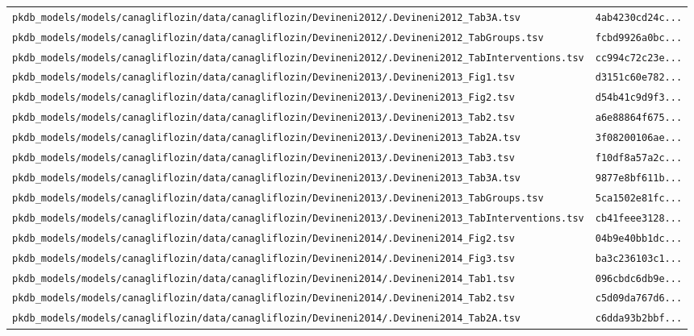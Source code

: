 \documentclass{article}
\begin{document}
\begin{longtable}{ll}
\texttt{pkdb\_models/models/canagliflozin/data/canagliflozin/Devineni2012/.Devineni2012\_Tab3A.tsv} & \texttt{4ab4230cd24c...} \\
\texttt{pkdb\_models/models/canagliflozin/data/canagliflozin/Devineni2012/.Devineni2012\_TabGroups.tsv} & \texttt{fcbd9926a0bc...} \\
\texttt{pkdb\_models/models/canagliflozin/data/canagliflozin/Devineni2012/.Devineni2012\_TabInterventions.tsv} & \texttt{cc994c72c23e...} \\
\texttt{pkdb\_models/models/canagliflozin/data/canagliflozin/Devineni2013/.Devineni2013\_Fig1.tsv} & \texttt{d3151c60e782...} \\
\texttt{pkdb\_models/models/canagliflozin/data/canagliflozin/Devineni2013/.Devineni2013\_Fig2.tsv} & \texttt{d54b41c9d9f3...} \\
\texttt{pkdb\_models/models/canagliflozin/data/canagliflozin/Devineni2013/.Devineni2013\_Tab2.tsv} & \texttt{a6e88864f675...} \\
\texttt{pkdb\_models/models/canagliflozin/data/canagliflozin/Devineni2013/.Devineni2013\_Tab2A.tsv} & \texttt{3f08200106ae...} \\
\texttt{pkdb\_models/models/canagliflozin/data/canagliflozin/Devineni2013/.Devineni2013\_Tab3.tsv} & \texttt{f10df8a57a2c...} \\
\texttt{pkdb\_models/models/canagliflozin/data/canagliflozin/Devineni2013/.Devineni2013\_Tab3A.tsv} & \texttt{9877e8bf611b...} \\
\texttt{pkdb\_models/models/canagliflozin/data/canagliflozin/Devineni2013/.Devineni2013\_TabGroups.tsv} & \texttt{5ca1502e81fc...} \\
\texttt{pkdb\_models/models/canagliflozin/data/canagliflozin/Devineni2013/.Devineni2013\_TabInterventions.tsv} & \texttt{cb41feee3128...} \\
\texttt{pkdb\_models/models/canagliflozin/data/canagliflozin/Devineni2014/.Devineni2014\_Fig2.tsv} & \texttt{04b9e40bb1dc...} \\
\texttt{pkdb\_models/models/canagliflozin/data/canagliflozin/Devineni2014/.Devineni2014\_Fig3.tsv} & \texttt{ba3c236103c1...} \\
\texttt{pkdb\_models/models/canagliflozin/data/canagliflozin/Devineni2014/.Devineni2014\_Tab1.tsv} & \texttt{096cbdc6db9e...} \\
\texttt{pkdb\_models/models/canagliflozin/data/canagliflozin/Devineni2014/.Devineni2014\_Tab2.tsv} & \texttt{c5d09da767d6...} \\
\texttt{pkdb\_models/models/canagliflozin/data/canagliflozin/Devineni2014/.Devineni2014\_Tab2A.tsv} & \texttt{c6dda93b2bbf...} \\

\end{longtable}
\end{document}
